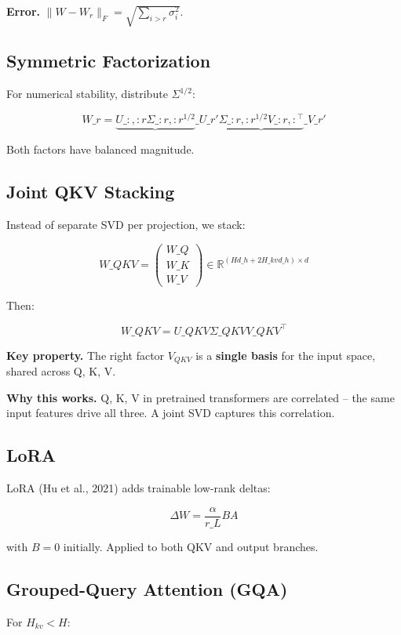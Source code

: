 \textbf{Error.} $\|W - W_r\|_F = \sqrt{\sum_{i > r} \sigma_i^2}$.

\subsection{Symmetric Factorization}

For numerical stability, distribute $\Sigma^{1/2}$:

\[
W\_r = \underbrace{U\_{:, :r} \Sigma\_{:r, :r}^{1/2}}\_{U\_r'} \underbrace{\Sigma\_{:r, :r}^{1/2} V\_{:r, :}^\top}\_{V\_r'}
\]

Both factors have balanced magnitude.

\subsection{Joint QKV Stacking}

Instead of separate SVD per projection, we stack:

\[
W\_{QKV} = \begin{pmatrix} W\_Q \\ W\_K \\ W\_V \end{pmatrix} \in \mathbb{R}^{(H d\_h + 2 H\_{kv} d\_h) \times d}
\]

Then:

\[
W\_{QKV} = U\_{QKV} \Sigma\_{QKV} V\_{QKV}^\top
\]

\textbf{Key property.} The right factor $V_{QKV}$ is a \textbf{single basis} for the 
input space, shared across Q, K, V.

\textbf{Why this works.} Q, K, V in pretrained transformers are correlated -- the 
same input features drive all three. A joint SVD captures this correlation.

\subsection{LoRA}

LoRA (Hu et al., 2021) adds trainable low-rank deltas:

\[
\Delta W = \frac{\alpha}{r\_L} B A
\]

with $B = 0$ initially. Applied to both QKV and output branches.

\subsection{Grouped-Query Attention (GQA)}

For $H_{kv} < H$:

